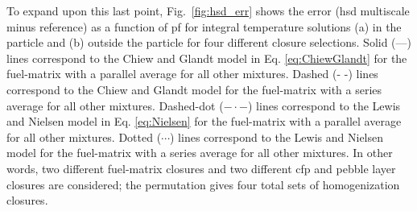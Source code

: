 To expand upon this last point, Fig.\ \ref{fig:hsd_err} shows the error (\gls{hsd} multiscale minus reference) as a function of \gls{pf} for integral temperature solutions (a) in the particle and (b) outside the particle for four different closure selections. Solid (---) lines correspond to the Chiew and Glandt model in Eq. \eqref{eq:ChiewGlandt} for the fuel-matrix with a parallel average for all other mixtures. Dashed (- -) lines correspond to the Chiew and Glandt model for the fuel-matrix with a series average for all other mixtures. Dashed-dot ($-\cdot-$) lines correspond to the Lewis and Nielsen model in Eq. \eqref{eq:Nielsen} for the fuel-matrix with a parallel average for all other mixtures. Dotted ($\cdots$) lines correspond to the Lewis and Nielsen model for the fuel-matrix with a series average for all other mixtures. In other words, two different fuel-matrix closures and two different \gls{cfp} and pebble layer closures are considered; the permutation gives four total sets of homogenization closures.

